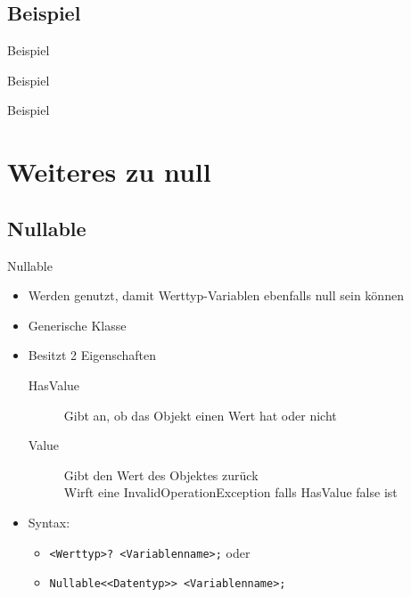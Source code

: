 \subsection{Beispiel}
\begin{frame}{Beispiel}
	
\end{frame}

\begin{frame}{Beispiel}
	
\end{frame}

\begin{frame}{Beispiel}
	
\end{frame}

\section{Weiteres zu null}
\subsection{Nullable}
\begin{frame}{Nullable}
	\begin{itemize}
		\item Werden genutzt, damit Werttyp-Variablen ebenfalls \alert{null} sein können
		\item Generische Klasse
		\item Besitzt 2 Eigenschaften
		\begin{description}
			\item[HasValue] Gibt an, ob das Objekt einen Wert hat oder nicht
			\item[Value] Gibt den Wert des Objektes zurück\\ Wirft eine InvalidOperationException falls HasValue \alert{false} ist 
		\end{description}
		\item Syntax:
		\begin{itemize}
			\item \texttt{\alert{<Werttyp>}? \alert{<Variablenname>};} oder
			\item \texttt{Nullable<\alert{<Datentyp>}> \alert{<Variablenname>};}
		\end{itemize}
	\end{itemize}
\end{frame}

